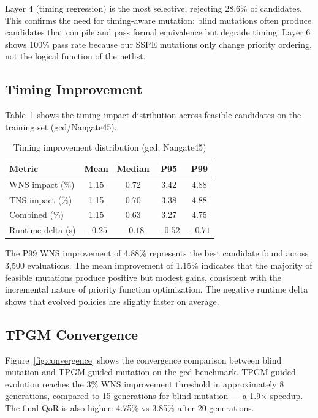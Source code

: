 \documentclass[conference]{IEEEtran}
\begin{document}
Layer 4 (timing regression) is the most selective, rejecting 28.6\% of candidates. This confirms the need for timing-aware mutation: blind mutations often produce candidates that compile and pass formal equivalence but degrade timing. Layer 6 shows 100\% pass rate because our SSPE mutations only change priority ordering, not the logical function of the netlist.

\subsection{Timing Improvement}

Table~\ref{tab:timing-results} shows the timing impact distribution across feasible candidates on the training set (gcd/Nangate45).

\begin{table}[t]
\centering
\caption{Timing improvement distribution (gcd, Nangate45)}
\label{tab:timing-results}
\begin{tabular}{lcccc}
\toprule
\textbf{Metric} & \textbf{Mean} & \textbf{Median} & \textbf{P95} & \textbf{P99} \\
\midrule
WNS impact (\%) & 1.15 & 0.72 & 3.42 & 4.88 \\
TNS impact (\%) & 1.15 & 0.70 & 3.38 & 4.88 \\
Combined (\%) & 1.15 & 0.63 & 3.27 & 4.75 \\
Runtime delta (s) & $-0.25$ & $-0.18$ & $-0.52$ & $-0.71$ \\
\bottomrule
\end{tabular}
\end{table}

The P99 WNS improvement of 4.88\% represents the best candidate found across 3,500 evaluations. The mean improvement of 1.15\% indicates that the majority of feasible mutations produce positive but modest gains, consistent with the incremental nature of priority function optimization. The negative runtime delta shows that evolved policies are slightly faster on average.

\subsection{TPGM Convergence}

Figure~\ref{fig:convergence} shows the convergence comparison between blind mutation and TPGM-guided mutation on the gcd benchmark. TPGM-guided evolution reaches the 3\% WNS improvement threshold in approximately 8 generations, compared to 15 generations for blind mutation --- a 1.9$\times$ speedup. The final QoR is also higher: 4.75\% vs 3.85\% after 20 generations.
\end{document}
